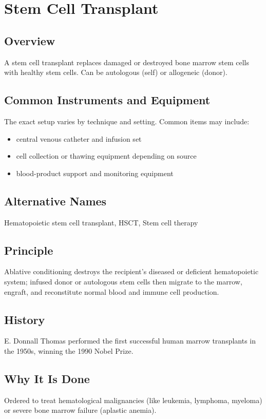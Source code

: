 \chapter{Stem Cell Transplant}

\section*{Overview}
A stem cell transplant replaces damaged or destroyed bone marrow stem cells with healthy stem cells. Can be autologous (self) or allogeneic (donor).

\section*{Common Instruments and Equipment}
The exact setup varies by technique and setting. Common items may include:
\begin{itemize}[nosep,leftmargin=*]
  \item central venous catheter and infusion set
  \item cell collection or thawing equipment depending on source
  \item blood-product support and monitoring equipment
\end{itemize}

\section*{Alternative Names}
Hematopoietic stem cell transplant, HSCT, Stem cell therapy

\section*{Principle}
Ablative conditioning destroys the recipient's diseased or deficient hematopoietic system; infused donor or autologous stem cells then migrate to the marrow, engraft, and reconstitute normal blood and immune cell production.
\section*{History}
E. Donnall Thomas performed the first successful human marrow transplants in the 1950s, winning the 1990 Nobel Prize.

\section*{Why It Is Done}
Ordered to treat hematological malignancies (like leukemia, lymphoma, myeloma) or severe bone marrow failure (aplastic anemia).

